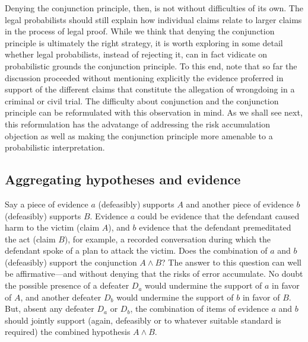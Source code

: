 \documentclass[10pt,dvipsnames,enabledeprecatedfontcommands]{scrartcl}
\newcommand{\et}{\wedge}
\begin{document}
Denying the conjunction principle, then, is not without difficulties of
its own. The legal probabilists should still explain how individual
claims relate to larger claims in the process of legal proof. While we
think that denying the conjunction principle is ultimately the right
strategy,
it is worth exploring in some detail whether legal probabilists, instead
of rejecting it, can in fact vidicate on probabilistic grounds the
conjunction principle. To this end, note that so far the discussion
proceeded without mentioning explicitly the evidence proferred in
support of the different claims that constitute the allegation of
wrongdoing in a criminal or civil trial. The difficulty about
conjunction and the conjunction principle can be reformulated with this
observation in
mind. As we
shall see next, this reformulation has the advatange of addressing the
risk accumulation objection as well as making the conjunction principle
more amenable to a probabilistic interpretation.

\subsection{Aggregating hypotheses and
evidence}\label{aggregating-hypotheses-and-evidence}

Say a piece of evidence \(a\) (defeasibly) supports \(A\) and another
piece of evidence \(b\) (defeasibly) supports \(B\). Evidence \(a\)
could be evidence that the defendant caused harm to the victim (claim
\(A\)), and \(b\) evidence that the defendant premeditated the act
(claim \(B\)), for example, a recorded conversation during which the
defendant spoke of a plan to attack the victim. Does the combination of
\(a\) and \(b\) (defeasibly) support the conjunction \(A \et B\)? The
answer to this question can well be affirmative---and without denying
that the risks of error accumulate. No doubt the possible presence of a
defeater \(D_a\) would undermine the support of \(a\) in favor of \(A\),
and another defeater \(D_b\) would undermine the support of \(b\) in
favor of \(B\). But, absent any defeater \(D_a\) or \(D_b\), the
combination of items of evidence \(a\) and \(b\) should jointly support
(again, defeasibly or to whatever suitable standard is required) the
combined hypothesis \(A \wedge B\).
\end{document}
